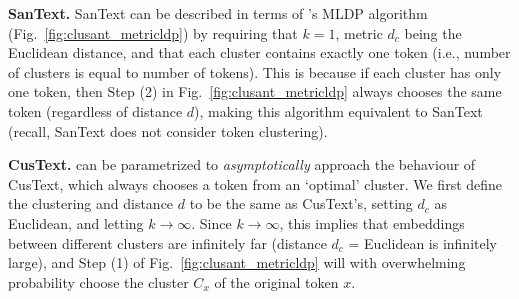 \vspace{0.5em}

\noindent
\textbf{SanText.} SanText can be described in terms of \clusant's MLDP algorithm (Fig.~\ref{fig:clusant_metricldp}) by requiring that $k = 1$, metric $d_c$ being the Euclidean distance, and that each cluster contains exactly one token (i.e., number of clusters is equal to number of tokens). This is because if each cluster has only one token, then Step (2) in Fig.~\ref{fig:clusant_metricldp} always chooses the same token (regardless of distance $d$), making this algorithm equivalent to SanText (recall, SanText does not consider token clustering).

\vspace{0.5em}

\noindent
\textbf{CusText.} \clusant can be parametrized to {\em asymptotically} approach the behaviour of CusText, which always chooses a token from an `optimal' cluster. We first define the clustering and distance $d$ to be the same as CusText's, setting $d_c$ as Euclidean, and letting $k \rightarrow \infty$. Since $k \rightarrow \infty$, this implies that embeddings between different clusters are infinitely far (distance $d_c$ = Euclidean is infinitely large), and Step (1) of Fig.~\ref{fig:clusant_metricldp} will with overwhelming probability choose the cluster $C_x$ of the original token $x$.